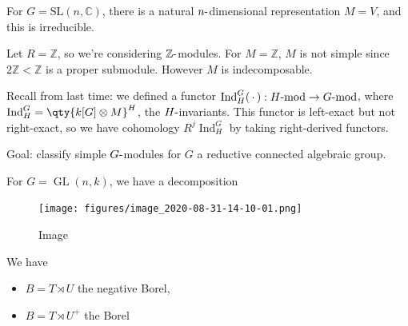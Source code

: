 \begin{example}

\begin{example}

For \(G = {\text{SL}}(n, {\mathbb{C}})\), there is a natural
\(n{\hbox{-}}\)dimensional representation \(M = V\), and this is
irreducible.

\end{example}

\end{example}


\begin{example}

\begin{example}

Let \(R = {\mathbb{Z}}\), so we're considering
\({\mathbb{Z}}{\hbox{-}}\)modules. For \(M={\mathbb{Z}}\), \(M\) is not
simple since \(2{\mathbb{Z}}< {\mathbb{Z}}\) is a proper submodule.
However \(M\) is indecomposable.

\end{example}

\end{example}

Recall from last time: we defined a functor
\(\operatorname{Ind}_H^G({\,\cdot\,}): H{\hbox{-}}\text{mod} \to G{\hbox{-}}\text{mod}\),
where \(\operatorname{Ind}_H^G = \qty{k[G] \otimes M}^H\), the
\(H{\hbox{-}}\)invariants. This functor is left-exact but not
right-exact, so we have cohomology \(R^j \operatorname{Ind}_H^G\) by
taking right-derived functors.

Goal: classify simple \(G{\hbox{-}}\)modules for \(G\) a reductive
connected algebraic group.

\begin{example}

\begin{example}

For \(G = \operatorname{GL}(n , k)\), we have a decomposition

\begin{figure}
\centering
\texttt{[image: figures/image\_2020-08-31-14-10-01.png]}
\caption{Image}
\end{figure}

\end{example}

\end{example}

We have

\begin{itemize}
\tightlist
\item
  \(B = T\rtimes U\) the negative Borel,
\item
  \(B = T\rtimes U^+\) the Borel
\end{itemize}


